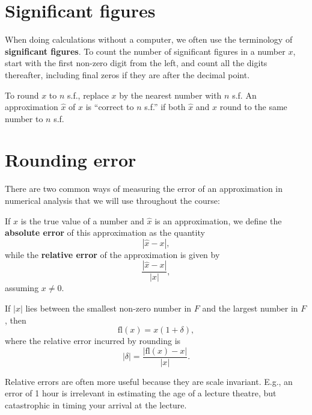\documentclass[
  letterpaper,
  DIV=11,
  numbers=noendperiod]{scrreprt}
\newenvironment{fbxSimple}[3]{\begin{tcolorbox}[enhanced, breakable,%
attach boxed title to top*={xshift=1.4pt},
boxed title style={boxrule=0.0mm, fuzzy shadow={1pt}{-1pt}{0mm}{0.1mm}{gray}, arc=.3em, rounded corners=east, sharp corners=west}, colframe=#1-color2, colbacktitle=#1-color1, colback = white, coltitle=black,  titlerule=0mm, toprule=0pt, bottomrule=.7pt, leftrule=.3em, rightrule=.7pt, outer arc=.3em,  	left=.5em, right=.5em, bottomtitle=1mm, toptitle=1mm,title=\textbf{#2}\hspace{0.5em}{#3}]}
{\end{tcolorbox}}
\begin{document}
\section{Significant figures}\label{significant-figures}

When doing calculations without a computer, we often use the terminology
of \textbf{significant figures}. To count the number of significant
figures in a number \(x\), start with the first non-zero digit from the
left, and count all the digits thereafter, including final zeros if they
are after the decimal point.

To round \(x\) to \(n\) s.f., replace \(x\) by the nearest number with
\(n\) s.f. An approximation \(\hat{x}\) of \(x\) is ``correct to \(n\)
s.f.'' if both \(\hat{x}\) and \(x\) round to the same number to \(n\)
s.f.

\section{Rounding error}\label{rounding-error}

There are two common ways of measuring the error of an approximation in
numerical analysis that we will use throughout the course:

\label{absolute-and-relative-errors}
\begin{fbxSimple}{definition}{Definition 1.1: }{Absolute and relative errors}
\label{absolute-and-relative-errors}
If \(x\) is the true value of a number and \(\hat{x}\) is an
approximation, we define the \textbf{absolute error} of this
approximation as the quantity \[
|\hat{x} - x|,
\] while the \textbf{relative error} of the approximation is given by \[
\frac{|\hat{x} - x|}{|x|},
\] assuming \(x \neq 0\).

\end{fbxSimple}

If \(|x|\) lies between the smallest non-zero number in \(F\) and the
largest number in \(F\), then \[
\mathrm{fl}(x) = x(1+\delta),
\] where the relative error incurred by rounding is \[
|\delta| = \frac{|\mathrm{fl}(x) - x|}{|x|}.
\]

\begin{tcolorbox}[enhanced jigsaw, opacityback=0, breakable, title=\textcolor{quarto-callout-note-color}{\faInfo}\hspace{0.5em}{Note}, arc=.35mm, coltitle=black, opacitybacktitle=0.6, bottomrule=.15mm, leftrule=.75mm, left=2mm, colbacktitle=quarto-callout-note-color!10!white, titlerule=0mm, toptitle=1mm, bottomtitle=1mm, colframe=quarto-callout-note-color-frame, rightrule=.15mm, colback=white, toprule=.15mm]

Relative errors are often more useful because they are scale invariant.
E.g., an error of 1 hour is irrelevant in estimating the age of a
lecture theatre, but catastrophic in timing your arrival at the lecture.

\end{tcolorbox}
\end{document}
